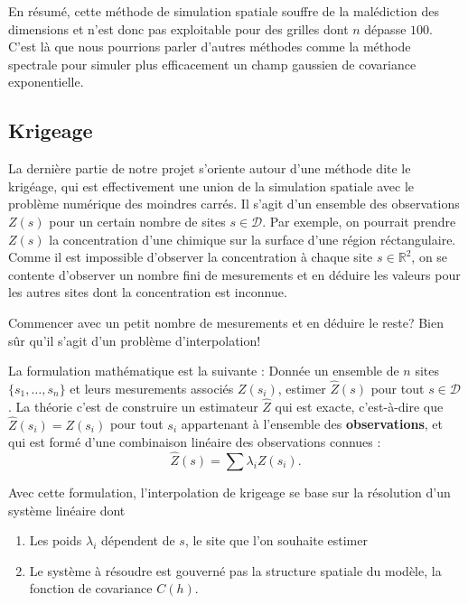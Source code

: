\documentclass[10pt]{article} %
\begin{document}
En résumé, cette méthode de simulation spatiale souffre de la malédiction des dimensions et n'est donc pas exploitable pour des grilles
dont $n$ dépasse $100$. C'est là que nous pourrions parler d'autres méthodes comme la méthode spectrale pour simuler plus efficacement un
champ gaussien de covariance exponentielle.


\subsection{Krigeage} La dernière partie de notre projet s'oriente autour d'une méthode dite le krigéage, qui est effectivement une union de la simulation spatiale
avec le problème numérique des moindres carrés. Il s'agit d'un ensemble des observations $Z(s)$ pour un certain nombre de sites $s \in \mathcal{D}$. Par exemple, on pourrait
prendre $Z(s)$ la concentration d'une chimique sur la surface d'une région réctangulaire. Comme il est impossible d'observer la concentration à chaque site $s \in \mathbb{R}^2$,
on se contente d'observer un nombre fini de mesurements et en déduire les valeurs pour les autres sites dont la concentration est inconnue.

    Commencer avec un petit nombre de mesurements et en déduire le reste? Bien sûr qu'il s'agit d'un problème d'interpolation!

La formulation mathématique est la suivante : Donnée un ensemble de $n$ sites $\{s_1, \dots, s_n\}$ et leurs mesurements associés $Z(s_i)$, estimer
$\hat Z(s)$ pour tout $s \in \mathcal{D}$. La théorie c'est de construire un estimateur $\hat Z$ qui est exacte, c'est-à-dire que $\hat Z(s_i) = Z(s_i)$ pour
tout $s_i$ appartenant à l'ensemble des \textbf{observations}, et qui est formé d'une combinaison linéaire des observations connues :
$$ \hat Z(s) =  \sum \lambda_i Z(s_i).$$

Avec cette formulation, l'interpolation de krigeage se base sur la résolution d'un système linéaire dont
\begin{enumerate}
    \item Les poids $\lambda_i$ dépendent de $s$, le site que l'on souhaite estimer
    \item Le système à résoudre est gouverné pas la structure spatiale du modèle, la fonction de covariance $C(h)$.
\end{enumerate}
\end{document}
